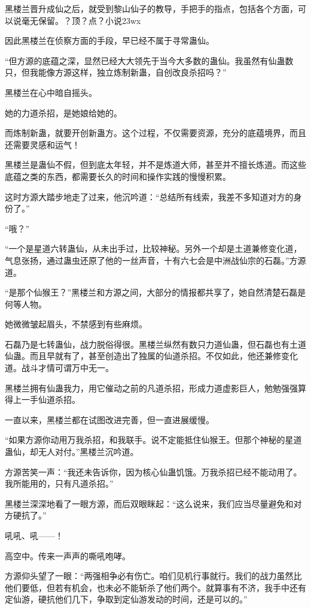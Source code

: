 
\begin{this_body}

黑楼兰晋升成仙之后，就受到黎山仙子的教导，手把手的指点，包括各个方面，可以说毫无保留。？顶？点？小说23wx

因此黑楼兰在侦察方面的手段，早已经不属于寻常蛊仙。

“但方源的底蕴之深，显然已经大大领先于当今大多数的蛊仙。我虽然有仙蛊数只，但我能像方源这样，独立炼制新蛊，自创改良杀招吗？”

黑楼兰在心中暗自摇头。

她的力道杀招，是她娘给她的。

而炼制新蛊，就要开创新蛊方。这个过程，不仅需要资源，充分的底蕴境界，而且还需要灵感和运气！

黑楼兰是蛊仙不假，但到底太年轻，并不是炼道大师，甚至并不擅长炼道。而这些底蕴之类的东西，都需要长久的时间和操作实践的慢慢积累。

这时方源大踏步地走了过来，他沉吟道：“总结所有线索，我差不多知道对方的身份了。”

“哦？”

“一个是星道六转蛊仙，从未出手过，比较神秘。另外一个却是土道兼修变化道，气息张扬，通过蛊虫还原了他的一丝声音，十有六七会是中洲战仙宗的石磊。”方源道。

“是那个仙猴王？”黑楼兰和方源之间，大部分的情报都共享了，她自然清楚石磊是何等人物。

她微微皱起眉头，不禁感到有些麻烦。

石磊乃是七转蛊仙，战力脱俗得很。黑楼兰纵然有数只力道仙蛊，但石磊也有土道仙蛊。而且早就有了，甚至创造出了独属的仙道杀招。不仅如此，他还兼修变化道。战斗才情可谓万中无一。

黑楼兰拥有仙蛊我力，用它催动之前的凡道杀招，形成力道虚影巨人，勉勉强强算得上一手仙道杀招。

一直以来，黑楼兰都在试图改进完善，但一直进展缓慢。

“如果方源你动用万我杀招，和我联手。说不定能抵住仙猴王。但那个神秘的星道蛊仙，却无人对付。”黑楼兰沉吟道。

方源苦笑一声：“我还未告诉你，因为核心仙蛊饥饿。万我杀招已经不能动用了。我所能用的，只有凡道杀招。”

黑楼兰深深地看了一眼方源，而后双眼眯起：“这么说来，我们应当尽量避免和对方硬抗了。”

吼吼、吼——！

高空中。传来一声声的嘶吼咆哮。

方源仰头望了一眼：“两强相争必有伤亡。咱们见机行事就行。我们的战力虽然比他们要低，但若有机会，也未必不能斩杀了他们两个。就算事有不济，我手中还有定仙游，硬抗他们几下，争取到定仙游发动的时间，还是可以的。”


\end{this_body}
